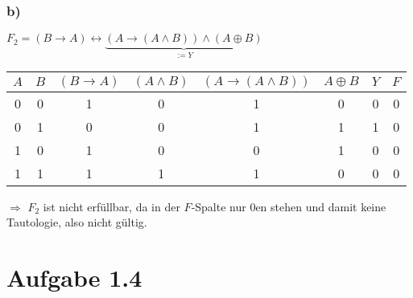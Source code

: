 \documentclass[a4paper,12pt]{article}
\begin{document}
	\subsubsection*{b)}
	\begin{center}
		$F_2 = \left( B \rightarrow A \right) \leftrightarrow \underbrace{\left( A \rightarrow \left( A \wedge B \right) \right) \wedge \left( A \oplus B \right)}_{:= Y}$
	\end{center}
	\begin{table}[H]
		\centering
		\begin{tabular}{c|c|c|c|c|c|c|c}
			$A$ & $B$ & $\left( B \rightarrow A\right)$ & $\left( A \wedge B\right)$ & $\left( A \rightarrow \left( A \wedge B\right)\right)$ & $A \oplus B$ & $Y$ & $F$\\ \hline
			0 & 0 & 1 & 0 & 1 & 0 & 0 & 0 \\
			0 & 1 & 0 & 0 & 1 & 1 & 1 & 0 \\
			1 & 0 & 1 & 0 & 0 & 1 & 0 & 0 \\
			1 & 1 & 1 & 1 & 1 & 0 & 0 & 0
		\end{tabular}
	\end{table}
	\begin{center}
		$\Rightarrow$ $F_2$ ist nicht erfüllbar, da in der $F$-Spalte nur 0en stehen und damit keine Tautologie, also nicht gültig.
	\end{center}
	\newpage
	
	\section*{Aufgabe 1.4}
	
	
\end{document}
